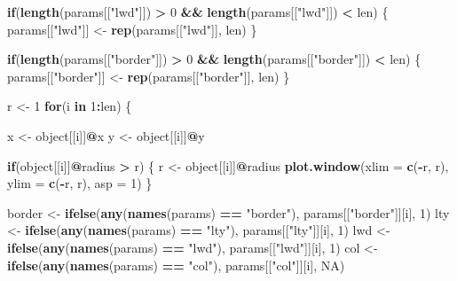 \documentclass[]{article}
\newenvironment{Shaded}{\begin{snugshade}}{\end{snugshade}}
\newcommand{\KeywordTok}[1]{\textcolor[rgb]{0.13,0.29,0.53}{\textbf{#1}}}
\newcommand{\DataTypeTok}[1]{\textcolor[rgb]{0.13,0.29,0.53}{#1}}
\newcommand{\DecValTok}[1]{\textcolor[rgb]{0.00,0.00,0.81}{#1}}
\newcommand{\StringTok}[1]{\textcolor[rgb]{0.31,0.60,0.02}{#1}}
\newcommand{\OtherTok}[1]{\textcolor[rgb]{0.56,0.35,0.01}{#1}}
\newcommand{\ControlFlowTok}[1]{\textcolor[rgb]{0.13,0.29,0.53}{\textbf{#1}}}
\newcommand{\OperatorTok}[1]{\textcolor[rgb]{0.81,0.36,0.00}{\textbf{#1}}}
\newcommand{\NormalTok}[1]{#1}
\begin{document}
\begin{Shaded}
\begin{Highlighting}[]
  \ControlFlowTok{if}\NormalTok{(}\KeywordTok{length}\NormalTok{(params[[}\StringTok{"lwd"}\NormalTok{]]) }\OperatorTok{>}\StringTok{ }\DecValTok{0} \OperatorTok{&&}\StringTok{ }\KeywordTok{length}\NormalTok{(params[[}\StringTok{"lwd"}\NormalTok{]]) }\OperatorTok{<}\StringTok{ }\NormalTok{len) \{}
\NormalTok{    params[[}\StringTok{"lwd"}\NormalTok{]] <-}\StringTok{ }\KeywordTok{rep}\NormalTok{(params[[}\StringTok{"lwd"}\NormalTok{]], len)}
\NormalTok{  \}}
  
  \ControlFlowTok{if}\NormalTok{(}\KeywordTok{length}\NormalTok{(params[[}\StringTok{"border"}\NormalTok{]]) }\OperatorTok{>}\StringTok{ }\DecValTok{0} \OperatorTok{&&}\StringTok{ }\KeywordTok{length}\NormalTok{(params[[}\StringTok{"border"}\NormalTok{]]) }\OperatorTok{<}\StringTok{ }\NormalTok{len) \{}
\NormalTok{    params[[}\StringTok{"border"}\NormalTok{]] <-}\StringTok{ }\KeywordTok{rep}\NormalTok{(params[[}\StringTok{"border"}\NormalTok{]], len)}
\NormalTok{  \}}
  
\NormalTok{  r <-}\StringTok{ }\DecValTok{1}
  \ControlFlowTok{for}\NormalTok{(i }\ControlFlowTok{in} \DecValTok{1}\OperatorTok{:}\NormalTok{len) \{}
    
\NormalTok{    x <-}\StringTok{ }\NormalTok{object[[i]]}\OperatorTok{@}\NormalTok{x}
\NormalTok{    y <-}\StringTok{ }\NormalTok{object[[i]]}\OperatorTok{@}\NormalTok{y}
    
    \ControlFlowTok{if}\NormalTok{(object[[i]]}\OperatorTok{@}\NormalTok{radius }\OperatorTok{>}\StringTok{ }\NormalTok{r) \{}
\NormalTok{      r <-}\StringTok{ }\NormalTok{object[[i]]}\OperatorTok{@}\NormalTok{radius}
      \KeywordTok{plot.window}\NormalTok{(}\DataTypeTok{xlim =} \KeywordTok{c}\NormalTok{(}\OperatorTok{-}\NormalTok{r, r), }\DataTypeTok{ylim =} \KeywordTok{c}\NormalTok{(}\OperatorTok{-}\NormalTok{r, r), }\DataTypeTok{asp =} \DecValTok{1}\NormalTok{)}
\NormalTok{    \}}
    
\NormalTok{    border <-}\StringTok{ }\KeywordTok{ifelse}\NormalTok{(}\KeywordTok{any}\NormalTok{(}\KeywordTok{names}\NormalTok{(params) }\OperatorTok{==}\StringTok{ "border"}\NormalTok{), params[[}\StringTok{"border"}\NormalTok{]][i], }\DecValTok{1}\NormalTok{)}
\NormalTok{    lty <-}\StringTok{ }\KeywordTok{ifelse}\NormalTok{(}\KeywordTok{any}\NormalTok{(}\KeywordTok{names}\NormalTok{(params) }\OperatorTok{==}\StringTok{ "lty"}\NormalTok{), params[[}\StringTok{"lty"}\NormalTok{]][i], }\DecValTok{1}\NormalTok{)}
\NormalTok{    lwd <-}\StringTok{ }\KeywordTok{ifelse}\NormalTok{(}\KeywordTok{any}\NormalTok{(}\KeywordTok{names}\NormalTok{(params) }\OperatorTok{==}\StringTok{ "lwd"}\NormalTok{), params[[}\StringTok{"lwd"}\NormalTok{]][i], }\DecValTok{1}\NormalTok{)}
\NormalTok{    col <-}\StringTok{ }\KeywordTok{ifelse}\NormalTok{(}\KeywordTok{any}\NormalTok{(}\KeywordTok{names}\NormalTok{(params) }\OperatorTok{==}\StringTok{ "col"}\NormalTok{), params[[}\StringTok{"col"}\NormalTok{]][i], }\OtherTok{NA}\NormalTok{)}
    

\end{Highlighting}
\end{Shaded}
\end{document}
